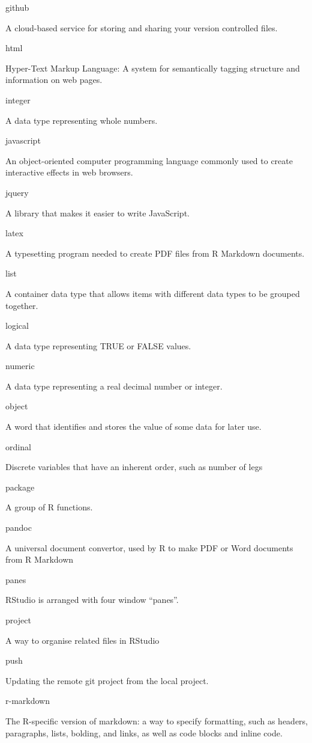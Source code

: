 \documentclass[
  oneside]{book}
\begin{document}
github

A cloud-based service for storing and sharing your version controlled files.

html

Hyper-Text Markup Language: A system for semantically tagging structure and information on web pages.

integer

A data type representing whole numbers.

javascript

An object-oriented computer programming language commonly used to create interactive effects in web browsers.

jquery

A library that makes it easier to write JavaScript.

latex

A typesetting program needed to create PDF files from R Markdown documents.

list

A container data type that allows items with different data types to be grouped together.

logical

A data type representing TRUE or FALSE values.

numeric

A data type representing a real decimal number or integer.

object

A word that identifies and stores the value of some data for later use.

ordinal

Discrete variables that have an inherent order, such as number of legs

package

A group of R functions.

pandoc

A universal document convertor, used by R to make PDF or Word documents from R Markdown

panes

RStudio is arranged with four window ``panes''.

project

A way to organise related files in RStudio

push

Updating the remote git project from the local project.

r-markdown

The R-specific version of markdown: a way to specify formatting, such as headers, paragraphs, lists, bolding, and links, as well as code blocks and inline code.
\end{document}
